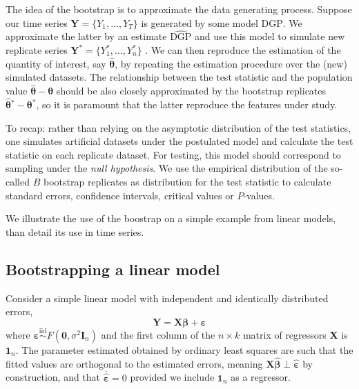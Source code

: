 \documentclass[]{book}
\begin{document}
The idea of the bootstrap is to approximate the data generating process.
Suppose our time series \(\boldsymbol{Y}=\{Y_1, \ldots, Y_T\}\) is
generated by some model \(\mathrm{DGP}\). We approximate the latter by
an estimate \(\widehat{\mathrm{DGP}}\) and use this model to simulate
new replicate series \(\boldsymbol{Y}^*=\{Y_1^* , \ldots , Y_n^*\}\) .
We can then reproduce the estimation of the quantity of interest, say
\(\widehat{\boldsymbol{\theta}}\), by repeating the estimation procedure
over the (new) simulated datasets. The relationship between the test
statistic and the population value
\(\widehat{\boldsymbol{\theta}}-\boldsymbol{\theta}\) should be also
closely approximated by the bootstrap replicates
\(\widehat{\boldsymbol{\theta}}{}^*-\boldsymbol{\theta}^*\), so it is
paramount that the latter reproduce the features under study.

To recap: rather than relying on the asymptotic distribution of the test
statistics, one simulates artificial datasets under the postulated model
and calculate the test statistic on each replicate dataset. For testing,
this model should correspond to sampling under the \emph{null
hypothesis}. We use the empirical distribution of the so-called \(B\)
bootstrap replicates as distribution for the test statistic to calculate
standard errors, confidence intervals, critical values or \(P\)-values.

We illustrate the use of the boostrap on a simple example from linear
models, than detail its use in time series.

\hypertarget{bootstrapping-a-linear-model}{%
\subsection{Bootstrapping a linear
model}\label{bootstrapping-a-linear-model}}

Consider a simple linear model with independent and identically
distributed errors,
\[\boldsymbol{Y} = \mathbf{X}\boldsymbol{\beta}+\boldsymbol{\varepsilon}\]
where
\(\boldsymbol{\varepsilon} \stackrel{\mathrm{iid}}{\sim} F(\boldsymbol{0}, \sigma^2\mathbf{I}_n)\)
and the first column of the \(n \times k\) matrix of regressors
\(\mathbf{X}\) is \(\boldsymbol{1}_n\). The parameter estimated obtained
by ordinary least squares are such that the fitted values are orthogonal
to the estimated errors, meaning
\(\mathbf{X}\hat{\boldsymbol{\beta}} \perp \hat{\boldsymbol{\varepsilon}}\)
by construction, and that
\(\overline{\hat{\boldsymbol{\varepsilon}}} = 0\) provided we include
\(\boldsymbol{1}_n\) as a regressor.
\end{document}

